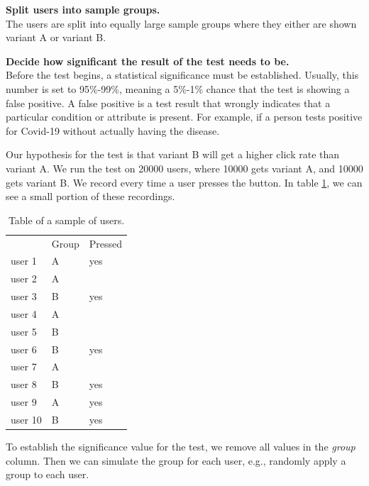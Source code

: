 \textbf{Split users into sample groups.}\\
The users are split into equally large sample groups where they either are shown variant A or variant B. 


\textbf{Decide how significant the result of the test needs to be.}\\
Before the test begins, a statistical significance must be established. Usually, this number is set to 95\%-99\%, meaning a 5\%-1\% chance that the test is showing a false positive. A false positive is a test result that wrongly indicates that a particular condition or attribute is present. For example, if a person tests positive for Covid-19 without actually having the disease.



Our hypothesis for the test is that variant B will get a higher click rate than variant A. We run the test on 20000 users, where 10000 gets variant A, and 10000 gets variant B. We record every time a user presses the button. In table \ref{tab:ab}, we can see a small portion of these recordings.

\begin{table}[H]
  \centering
\begin{tabular}{|l|l|l|}
\cline{1-3} 
        & Group & Pressed \\\cline{1-3} 
user 1  & A     & yes     \\\cline{1-3} 
user 2  & A     &         \\\cline{1-3} 
user 3  & B     & yes     \\\cline{1-3} 
user 4  & A     &         \\\cline{1-3} 
user 5  & B     &         \\\cline{1-3} 
user 6  & B     & yes     \\\cline{1-3} 
user 7  & A     &         \\\cline{1-3} 
user 8  & B     & yes     \\\cline{1-3} 
user 9  & A     & yes     \\\cline{1-3} 
user 10 & B     & yes     \\\cline{1-3}  
\end{tabular}
\caption{Table of a sample of users.}
\label{tab:ab}
\end{table}

To establish the significance value for the test, we remove all values in the \textit{group} column. Then we can simulate the group for each user, e.g., randomly apply a group to each user. 


